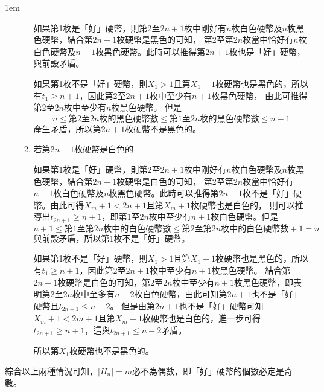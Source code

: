 \documentclass[12pt]{article}
\def\Ap{1em}
\begin{document}
\begin{mybox}[Answer]{6em}{1em}{\Ap}
\begin{enumerate}
\begin{enumerate}
            如果第1枚是「好」硬幣，則第2至$2n+1$枚中剛好有$n$枚白色硬幣及$n$枚黑色硬幣，結合第$2n+1$枚硬幣是黑色的可知，
            第2至第$2n$枚當中恰好有$n$枚白色硬幣及$n-1$枚黑色硬幣。此時可以推得第$2n+1$枚也是「好」硬幣，與前設矛盾。

            如果第1枚不是「好」硬幣，則$X_1>1$且第$X_1-1$枚硬幣也是黑色的，所以有$t_1\geq n+1$，因此第2至$2n+1$枚中至少有$n+1$枚黑色硬幣，
            由此可推得第2至$2n$枚中至少有$n$枚黑色硬幣。
            但是
            $$
            n\leq\text{第2至$2n$枚的黑色硬幣數}\leq\text{第1至$2n$枚的黑色硬幣數}\leq n-1
            $$
            產生矛盾，所以第$2n+1$枚硬幣不是黑色的。
            \item 若第$2n+1$枚硬幣是白色的
            
            如果第1枚是「好」硬幣，則第2至$2n+1$枚中剛好有$n$枚白色硬幣及$n$枚黑色硬幣，結合第$2n+1$枚硬幣是白色的可知，
            第2至第$2n$枚當中恰好有$n-1$枚白色硬幣及$n$枚黑色硬幣。此時可以推得第$2n+1$枚不是「好」硬幣。由此可得$X_m+1<2n+1$且第$X_m+1$枚硬幣也是白色的，
            則可以推導出$t_{2n+1}\geq n+1$，即第1至$2n$枚中至少有$n+1$枚白色硬幣。但是
            $$
                n+1\leq\text{第1至第$2n$枚中的白色硬幣數}\leq\text{第2至第$2n$枚中的白色硬幣數}+1=n
            $$
            與前設矛盾，所以第1枚不是「好」硬幣。

            如果第1枚不是「好」硬幣，則$X_1>1$且第$X_1-1$枚硬幣也是黑色的，所以有$t_1\geq n+1$，因此第2至$2n+1$枚中至少有$n+1$枚黑色硬幣。
            結合第$2n+1$枚硬幣是白色的可知，第2至$2n$枚中至少有$n+1$枚黑色硬幣，即表明第2至$2n$枚中至多有$n-2$枚白色硬幣，由此可知第$2n+1$也不是「好」硬幣且$t_{2n+1}\leq n-2$。
            但是由第$2n+1$也不是「好」硬幣可知$X_m+1<2m+1$且第$X_m+1$枚硬幣也是白色的，進一步可得$t_{2n+1}\geq n+1$，這與$t_{2n+1}\leq n-2$矛盾。

            所以第$X_1$枚硬幣也不是黑色的。
        \end{enumerate}
    \end{enumerate}
    綜合以上兩種情況可知，$|H_n|=m$必不為偶數，即「好」硬幣的個數必定是奇數。
\end{mybox}
\end{document}

